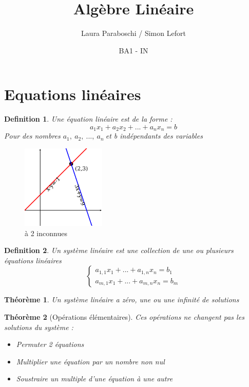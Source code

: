 \documentclass{article}
\title{Algèbre Linéaire}
\author{Laura Paraboschi / Simon Lefort }
\date{BA1 - IN}
\newtheorem{definition}{Definition}[section]
\newtheorem{theorem}{Théorème}[section]
\begin{document}
\maketitle

\section{Equations linéaires}
\begin{definition}
    Une équation linéaire est de la forme :
    \[ a_1x_1 + a_2x_2 + ... + a_nx_n = b \]
    Pour des nombres \( a_1, \ a_2, \ ..., \ a_n \ \)et b indépendants des variables
\end{definition}
\begin{figure}[h]
    \centering
    \includegraphics[width=4cm]{Images/1200px-Intersecting_Lines.svg.png}
    \caption{à 2 inconnues}
    \label{fig:Graphe 2 inconnues}
\end{figure}
\begin{definition}
    Un système linéaire est une collection de une ou plusieurs équations linéaires
    \begin{equation}
        \begin{cases}
            a_{1,1}x_1 + ... + a_{1,n}x_n = b_1\\
            a_{m,1}x_1 + ... + a_{m,n}x_n = b_m
        \end{cases}
    \end{equation}
\end{definition}
\begin{theorem}
    Un système linéaire a zéro, une ou une infinité de solutions
\end{theorem}
\begin{theorem}[Opérations élémentaires]
    Ces opérations ne changent pas les solutions du système :
    \begin{itemize}
        \item Permuter 2 équations
        \item Multiplier une équation par un nombre non nul
        \item Soustraire un multiple d'une équation à une autre
    \end{itemize}
\end{theorem}
\end{document}
